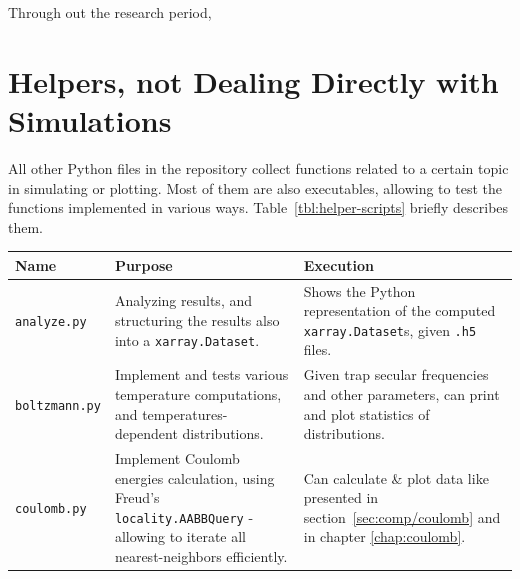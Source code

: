 Through out the research period,

\section{Helpers, not Dealing Directly with Simulations}

All other Python files in the repository collect functions related to a certain topic in simulating or plotting. Most of them are also executables, allowing to test the functions implemented in various ways. Table~\ref{tbl:helper-scripts} briefly describes them.

\begin{table}
\begin{tabularx}{\textwidth}{l|X|X}
Name                            & Purpose                                                                                                                                               & Execution                                                                                                                                                                                                                        \\
\hline
\texttt{analyze.py}             & Analyzing results, and structuring the results also into a \texttt{xarray.Dataset}.                                                                   & Shows the Python representation of the computed \texttt{xarray.Dataset}s, given \texttt{.h5} files.                                                                                                                                                  \\
\hline
\texttt{boltzmann.py}           & Implement and tests various temperature computations, and temperatures-dependent distributions.                                                       & Given trap secular frequencies and other parameters, can print and plot statistics of distributions.                                                                                                                                                 \\
\hline
\texttt{coulomb.py}             & Implement Coulomb energies calculation, using Freud's\cite{freud} \texttt{locality.AABBQuery} - allowing to iterate all nearest-neighbors efficiently. & Can calculate \& plot data like presented in section~\ref{sec:comp/coulomb} and in chapter \ref{chap:coulomb}.                                                                                                                                       \\

\end{tabularx}
\end{table}
